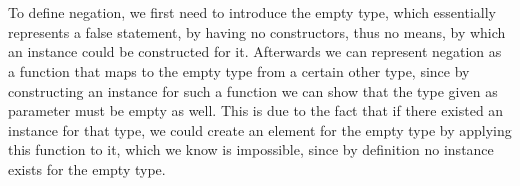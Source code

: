\begin{code}
    \>[0]\AgdaSpace{}%
    \AgdaSpace{}%
    \AgdaSymbol{(}\AgdaSpace{}%
    \AgdaSpace{}%
    \AgdaSymbol{:}\AgdaSpace{}%
    \AgdaSymbol{)}\AgdaSpace{}%
    \AgdaSymbol{:}\AgdaSpace{}%
    \AgdaSpace{}%
    \<%
    \\
    \>[0][@{}l@{\AgdaIndent{0}}]%
    \>[2]\AgdaSpace{}%
    \AgdaSymbol{:}\AgdaSpace{}%
    \AgdaSymbol{(}\AgdaSpace{}%
    \AgdaSymbol{:}\AgdaSpace{}%
    \AgdaSymbol{)}\AgdaSpace{}%
    \AgdaSpace{}%
    \AgdaSpace{}%
    \AgdaSpace{}%
    \<%
    \\
    \>[2]\AgdaSpace{}%
    \AgdaSymbol{:}\AgdaSpace{}%
    \AgdaSymbol{(}\AgdaSpace{}%
    \AgdaSymbol{:}\AgdaSpace{}%
    \AgdaSymbol{)}\AgdaSpace{}%
    \AgdaSpace{}%
    \AgdaSpace{}%
    \AgdaSpace{}%
    \<%
\end{code}

To define negation, we first need to introduce the empty type, which essentially represents a false statement, by having no constructors, thus no means, by which an instance could be constructed for it. Afterwards we can represent negation as a function that maps to the empty type from a certain other type, since by constructing an instance for such a function we can show that the type given as parameter must be empty as well. This is due to the fact that if there existed an instance for that type, we could create an element for the empty type by applying this function to it, which we know is impossible, since by definition no instance exists for the empty type.

\begin{code}
    \>[0]\AgdaSpace{}%
    \AgdaSpace{}%
    \AgdaSymbol{:}\AgdaSpace{}%
    \AgdaSpace{}%
    \<%
    \\
    \>[0]\<%
    \\
    \\[\AgdaEmptyExtraSkip]%
    \>[0]\AgdaSpace{}%
    \AgdaSymbol{:}\AgdaSpace{}%
    \AgdaSpace{}%
    \AgdaSpace{}%
    \<%
    \\
    \>[0]\AgdaSpace{}%
    \AgdaSpace{}%
    \AgdaSymbol{=}\AgdaSpace{}%
    \AgdaSpace{}%
    \AgdaSpace{}%
    \<%
\end{code}


